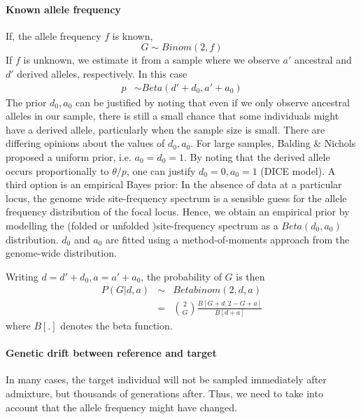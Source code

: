 \documentclass[10pt,a4paper]{article}
\begin{document}
\paragraph{Known allele frequency}
If, the allele frequency $f$ is known, 
\begin{equation}
G \sim Binom(2, f)
\end{equation}
If $f$ is unknown, we estimate it from a sample where we observe $a'$ ancestral and $d'$ derived alleles, respectively. In this case
\begin{align}
p &\sim Beta(d' + d_0, a' + a_0)
\end{align}
The prior $d_0, a_0$ can be justified by noting that even if we only observe ancestral alleles in our sample, there is still a small chance that some individuals might have a derived allele, particularly when the sample size is small. There are differing opinions about the values of $d_0, a_0$. For large samples, Balding \& Nichols proposed a uniform prior, i.e. $a_0=d_0=1$. By noting that the derived allele occurs proportionally to $\theta/p$, one can justify $d_0=0, a_0=1$ (DICE model). A third option is an empirical Bayes prior: In the absence of data at a particular locus, the genome wide site-frequency spectrum is a sensible guess for the allele frequency distribution of the focal locus. Hence, we obtain an empirical prior by modelling the (folded or unfolded )site-frequency spectrum as a $Beta(d_0, a_0)$ distribution. $d_0$ and $a_0$ are fitted using a method-of-moments approach from the genome-wide distribution.


Writing $d = d' + d_0, a = a'+a_0$, the probability of $G$ is then
\begin{eqnarray}
P(G | d, a) &\sim& Betabinom(2, d, a)\nonumber\\
&=& \binom{2}{G} \frac{B[G+d, 2-G + a]}{B[ d + a]} \label{eq:ll:homo}
\end{eqnarray}
where $B[.]$ denotes the beta function.
\paragraph{Genetic drift between reference and target}
In many cases, the target individual will not be sampled immediately after admixture, but thousands of generations after. Thus, we need to take into account that the allele frequency might have changed.
\end{document}
